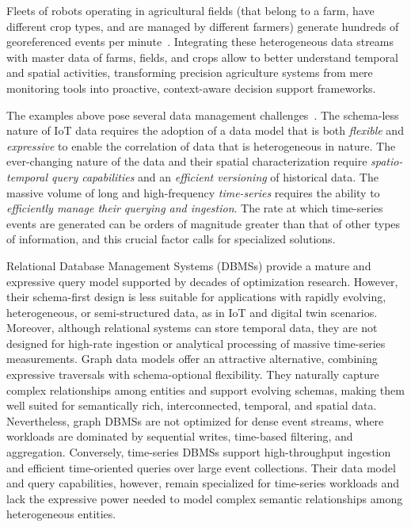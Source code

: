 \begin{example}
Fleets of robots operating in agricultural fields (that belong to a farm, have different crop types, and are managed by different farmers) generate hundreds of georeferenced events per minute~\cite{emmi2023exploiting}.
Integrating these heterogeneous data streams with master data of farms, fields, and crops allow to better understand temporal and spatial activities, transforming precision agriculture systems from mere monitoring tools into proactive, context-aware decision support frameworks.
\end{example}

The examples above pose several data management challenges~\cite{DBLP:journals/sigmod/Tian22}.
The schema-less nature of IoT data requires the adoption of a data model that is both \emph{flexible} and \emph{expressive} to enable the correlation of data that is heterogeneous in nature. 
The ever-changing nature of the data and their spatial characterization require \emph{spatio-temporal query capabilities} and an \emph{efficient versioning} of historical data. 
The massive volume of long and high-frequency \emph{time-series} requires the ability to \emph{efficiently manage their querying and ingestion}.
The rate at which time-series events are generated can be orders of magnitude greater than that of other types of information, and this crucial factor calls for specialized solutions. 

Relational Database Management Systems (DBMSs) provide a mature and expressive query model supported by decades of optimization research.
However, their schema-first design is less suitable for applications with rapidly evolving, heterogeneous, or semi-structured data, as in IoT and digital twin scenarios.
Moreover, although relational systems can store temporal data, they are not designed for high-rate ingestion or analytical processing of massive time-series measurements.
Graph data models offer an attractive alternative, combining expressive traversals with schema-optional flexibility.
They naturally capture complex relationships among entities and support evolving schemas, making them well suited for semantically rich, interconnected, temporal, and spatial data.
Nevertheless, graph DBMSs are not optimized for dense event streams, where workloads are dominated by sequential writes, time-based filtering, and aggregation.
Conversely, time-series DBMSs support high-throughput ingestion and efficient time-oriented queries over large event collections.
Their data model and query capabilities, however, remain specialized for time-series workloads and lack the expressive power needed to model complex semantic relationships among heterogeneous entities.

